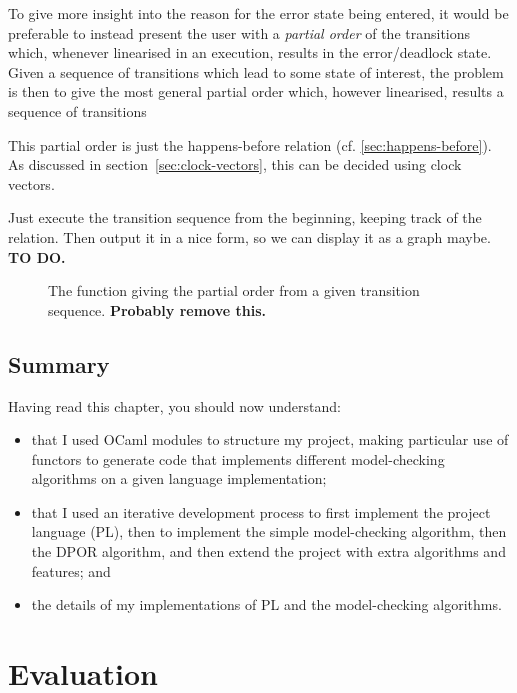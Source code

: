 \documentclass[12pt,a4paper,twoside,openright]{report}
\newenvironment{understandinglist}
	{\begin{itemize} \itemsep 0em}{\end{itemize}}
\begin{document}
To give more insight into the reason for the
error state being entered, it would be preferable
to instead present the user with a
\emph{partial order} of the transitions which,
whenever linearised in an execution,
results in the error/deadlock state.
Given a sequence of transitions which lead to
some state of interest, the problem is
then to give the most general partial order
which, however linearised, results a sequence
of transitions 

This partial order is just the happens-before
relation (cf. \ref{sec:happens-before}). As
discussed in section~\ref{sec:clock-vectors},
this can be decided using clock vectors.

Just execute the transition sequence
from the beginning, keeping track of the relation.
Then output it in a nice form, so we can display it
as a graph maybe. \textbf{TO DO.}

\begin{figure}	
	
	\caption{The function giving the partial order from
		a given transition sequence. \textbf{Probably remove this.}}
\end{figure}

\section{Summary}
Having read this chapter,
you should now understand:
\begin{understandinglist}
	\item that I used OCaml modules to
	structure my project, making
	particular use of functors to generate
	code that implements different model-checking
	algorithms on a given language implementation;
	\item that I used an iterative development
	process to first implement the project
	language (PL), then to implement the simple
	model-checking algorithm, then
	the DPOR algorithm, and then extend the project
	with extra algorithms and features; and
	\item the details of my
	implementations of PL and the
	model-checking algorithms.
	\end{understandinglist}

\chapter{Evaluation}
\label{cha:evaluation}
\end{document}
